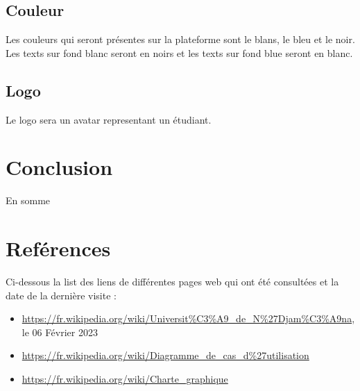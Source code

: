 \documentclass[12pt,a4paper]{article}
\begin{document}
	\subsection{Couleur}
	Les couleurs qui seront présentes sur la plateforme sont le blans, le bleu et le noir. Les texts sur fond blanc seront en noirs et les texts sur fond blue seront en blanc.
	
	\subsection{Logo}
	Le logo sera un avatar representant un étudiant.
	
	
	

	\newpage
	\section*{Conclusion}
	En somme
	
	\newpage
	\listoffigures
	\listoftables
	
	\newpage
	\section*{Reférences}
	Ci-dessous la list des liens de différentes pages web qui ont été consultées et la date de la dernière visite :
	\begin{itemize}
		\item \href{https://fr.wikipedia.org/wiki/Universit\%C3\%A9\_de\_N\%27Djam\%C3\%A9na}{https://fr.wikipedia.org/wiki/Universit\%C3\%A9\_de\_N\%27Djam\%C3\%A9na}, le 06 Février 2023
		\item \href{https://fr.wikipedia.org/wiki/Diagramme_de_cas_d\%27utilisation}{https://fr.wikipedia.org/wiki/Diagramme\_de\_cas\_d\%27utilisation}
		\item \href{https://fr.wikipedia.org/wiki/Charte_graphique}{https://fr.wikipedia.org/wiki/Charte\_graphique}
	\end{itemize}	
\end{document}
